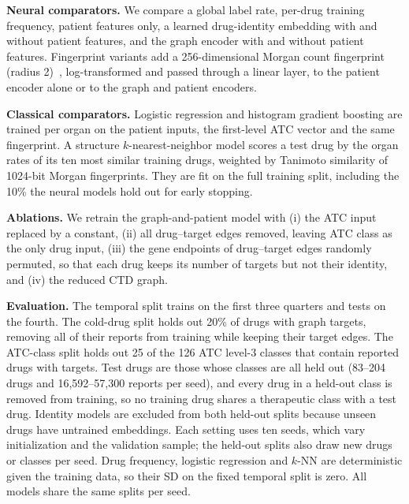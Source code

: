 \documentclass[conference,letterpaper]{IEEEtran}
\begin{document}
\textbf{Neural comparators.} We compare a global label rate, per-drug training frequency, patient features only, a learned drug-identity embedding with and without patient features, and the graph encoder with and without patient features. Fingerprint variants add a 256-dimensional Morgan count fingerprint (radius 2)~\cite{rogers2010}, log-transformed and passed through a linear layer, to the patient encoder alone or to the graph and patient encoders.

\textbf{Classical comparators.} Logistic regression and histogram gradient boosting are trained per organ on the patient inputs, the first-level ATC vector and the same fingerprint. A structure $k$-nearest-neighbor model scores a test drug by the organ rates of its ten most similar training drugs, weighted by Tanimoto similarity of 1024-bit Morgan fingerprints. They are fit on the full training split, including the 10\% the neural models hold out for early stopping.

\textbf{Ablations.} We retrain the graph-and-patient model with (i) the ATC input replaced by a constant, (ii) all drug--target edges removed, leaving ATC class as the only drug input, (iii) the gene endpoints of drug--target edges randomly permuted, so that each drug keeps its number of targets but not their identity, and (iv) the reduced CTD graph.

\textbf{Evaluation.} The temporal split trains on the first three quarters and tests on the fourth. The cold-drug split holds out 20\% of drugs with graph targets, removing all of their reports from training while keeping their target edges. The ATC-class split holds out 25 of the 126 ATC level-3 classes that contain reported drugs with targets. Test drugs are those whose classes are all held out (83--204 drugs and 16,592--57,300 reports per seed), and every drug in a held-out class is removed from training, so no training drug shares a therapeutic class with a test drug. Identity models are excluded from both held-out splits because unseen drugs have untrained embeddings. Each setting uses ten seeds, which vary initialization and the validation sample; the held-out splits also draw new drugs or classes per seed. Drug frequency, logistic regression and $k$-NN are deterministic given the training data, so their SD on the fixed temporal split is zero. All models share the same splits per seed.
\end{document}
